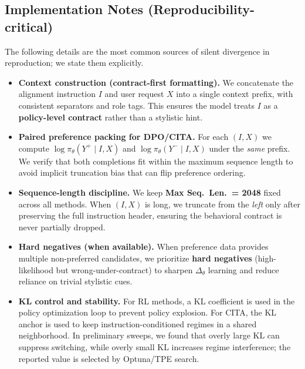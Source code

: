 \subsection{Implementation Notes (Reproducibility-critical)}

\vspace{-0.25em}
\noindent
The following details are the most common sources of silent divergence in reproduction; we state them explicitly.

\begin{itemize}[leftmargin=*,itemsep=2.5pt]
    \item \textbf{Context construction (contract-first formatting).}
    We concatenate the alignment instruction $I$ and user request $X$ into a single context prefix, with consistent separators and role tags.
    This ensures the model treats $I$ as a \textbf{policy-level contract} rather than a stylistic hint.

    \item \textbf{Paired preference packing for \textsc{DPO}/\textsc{CITA}.}
    For each $(I,X)$ we compute $\log\pi_\theta(Y^+\mid I,X)$ and $\log\pi_\theta(Y^-\mid I,X)$ under the \emph{same} prefix.
    We verify that both completions fit within the maximum sequence length to avoid implicit truncation bias that can flip preference ordering.

    \item \textbf{Sequence-length discipline.}
    We keep \textbf{Max Seq.\ Len.\ = 2048} fixed across all methods.
    When $(I,X)$ is long, we truncate from the \emph{left} only after preserving the full instruction header, ensuring the behavioral contract is never partially dropped.

    \item \textbf{Hard negatives (when available).}
    When preference data provides multiple non-preferred candidates, we prioritize \textbf{hard negatives} (high-likelihood but wrong-under-contract) to sharpen $\Delta_\theta$ learning and reduce reliance on trivial stylistic cues.

    \item \textbf{KL control and stability.}
    For RL methods, a KL coefficient is used in the policy optimization loop to prevent policy explosion.
    For \textsc{CITA}, the KL anchor is used to keep instruction-conditioned regimes in a shared neighborhood.
    In preliminary sweeps, we found that overly large KL can suppress switching, while overly small KL increases regime interference; the reported value is selected by Optuna/TPE search.


\end{itemize}

